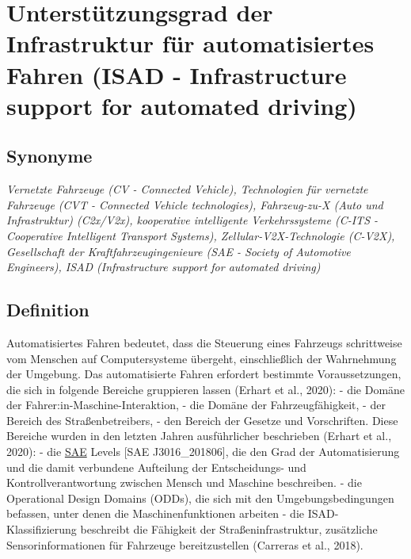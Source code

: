 \documentclass[
]{book}
\begin{document}
\hypertarget{infrast_support_level}{%
\section{Unterstützungsgrad der Infrastruktur für automatisiertes Fahren (ISAD - Infrastructure support for automated driving)}\label{infrast_support_level}}

\hypertarget{synonyme-17}{%
\subsection*{Synonyme}\label{synonyme-17}}

\emph{Vernetzte Fahrzeuge (CV - Connected Vehicle), Technologien für vernetzte Fahrzeuge (CVT - Connected Vehicle technologies), Fahrzeug-zu-X (Auto und Infrastruktur) (C2x/V2x), kooperative intelligente Verkehrssysteme (C-ITS - Cooperative Intelligent Transport Systems), Zellular-V2X-Technologie (C-V2X), Gesellschaft der Kraftfahrzeugingenieure (SAE - Society of Automotive Engineers), ISAD (Infrastructure support for automated driving)}

\hypertarget{definition-19}{%
\subsection*{Definition}\label{definition-19}}

Automatisiertes Fahren bedeutet, dass die Steuerung eines Fahrzeugs schrittweise vom Menschen auf Computersysteme übergeht, einschließlich der Wahrnehmung der Umgebung. Das automatisierte Fahren erfordert bestimmte Voraussetzungen, die sich in folgende Bereiche gruppieren lassen (Erhart et al., 2020):
- die Domäne der Fahrer:in-Maschine-Interaktion,
- die Domäne der Fahrzeugfähigkeit,
- der Bereich des Straßenbetreibers,
- den Bereich der Gesetze und Vorschriften.
Diese Bereiche wurden in den letzten Jahren ausführlicher beschrieben (Erhart et al., 2020):
- die \href{https://www.sae.org/}{SAE} Levels {[}SAE J3016\_201806{]}, die den Grad der Automatisierung und die damit verbundene Aufteilung der Entscheidungs- und Kontrollverantwortung zwischen Mensch und Maschine beschreiben.
- die Operational Design Domains (ODDs), die sich mit den Umgebungsbedingungen befassen, unter denen die Maschinenfunktionen arbeiten
- die ISAD-Klassifizierung beschreibt die Fähigkeit der Straßeninfrastruktur, zusätzliche Sensorinformationen für Fahrzeuge bereitzustellen (Carreras et al., 2018).
\end{document}
